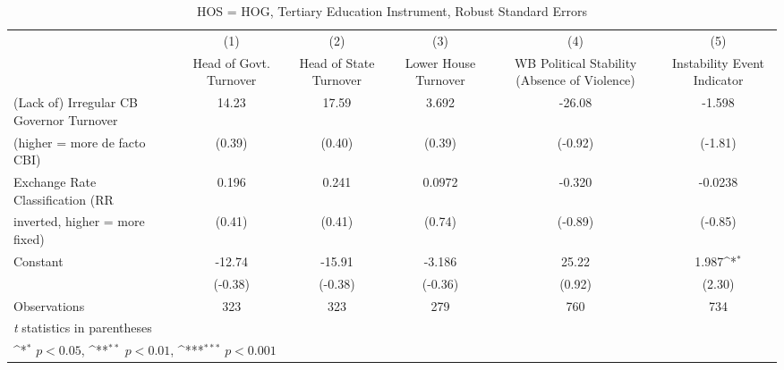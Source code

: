 \begin{table}[htbp]\centering
\def\sym#1{\ifmmode^{#1}\else\(^{#1}\)\fi}
\caption{HOS = HOG, Tertiary Education Instrument, Robust Standard Errors \label{hoshogfivs2}}
\begin{tabular}{l*{5}{c}}
\toprule
                                        &\multicolumn{1}{c}{(1)}&\multicolumn{1}{c}{(2)}&\multicolumn{1}{c}{(3)}&\multicolumn{1}{c}{(4)}&\multicolumn{1}{c}{(5)}\\
                                        &\multicolumn{1}{c}{Head of Govt. Turnover}&\multicolumn{1}{c}{Head of State Turnover}&\multicolumn{1}{c}{Lower House Turnover}&\multicolumn{1}{c}{WB Political Stability (Absence of Violence)}&\multicolumn{1}{c}{Instability Event Indicator}\\
\midrule
(Lack of) Irregular CB Governor Turnover&    14.23         &    17.59         &    3.692         &   -26.08         &   -1.598         \\
(higher = more de facto CBI)            &   (0.39)         &   (0.40)         &   (0.39)         &  (-0.92)         &  (-1.81)         \\
\addlinespace
Exchange Rate Classification (RR        &    0.196         &    0.241         &   0.0972         &   -0.320         &  -0.0238         \\
inverted, higher = more fixed)          &   (0.41)         &   (0.41)         &   (0.74)         &  (-0.89)         &  (-0.85)         \\
\addlinespace
Constant                                &   -12.74         &   -15.91         &   -3.186         &    25.22         &    1.987\sym{*}  \\
                                        &  (-0.38)         &  (-0.38)         &  (-0.36)         &   (0.92)         &   (2.30)         \\
\midrule
Observations                            &      323         &      323         &      279         &      760         &      734         \\
\bottomrule
\multicolumn{6}{l}{\footnotesize \textit{t} statistics in parentheses}\\
\multicolumn{6}{l}{\footnotesize \sym{*} \(p<0.05\), \sym{**} \(p<0.01\), \sym{***} \(p<0.001\)}\\
\end{tabular}
\end{table}
